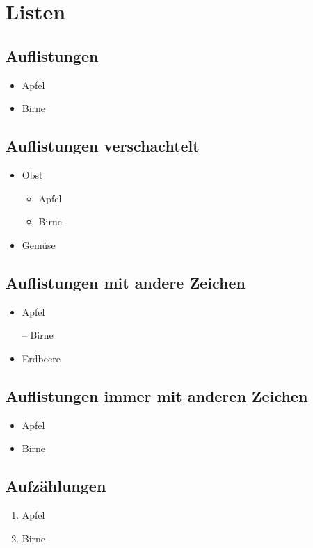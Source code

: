 \section{Listen}

\subsection{Auflistungen}
\begin{itemize}
    \item Apfel
    \item Birne
\end{itemize}

\subsection{Auflistungen verschachtelt}
\begin{itemize}
    \item Obst
          \begin{itemize}
              \item Apfel
              \item Birne
          \end{itemize}
    \item Gemüse
\end{itemize}


\subsection{Auflistungen mit andere Zeichen}
\begin{itemize}
    \item Apfel
    \item[--] Birne
    \item Erdbeere
\end{itemize}

\subsection{Auflistungen immer mit anderen Zeichen}
\begin{itemize}
    \renewcommand\labelitemi{--}
    \item Apfel
    \item Birne
\end{itemize}

\subsection{Aufzählungen}
\begin{enumerate}
    \item Apfel
    \item Birne
\end{enumerate}

